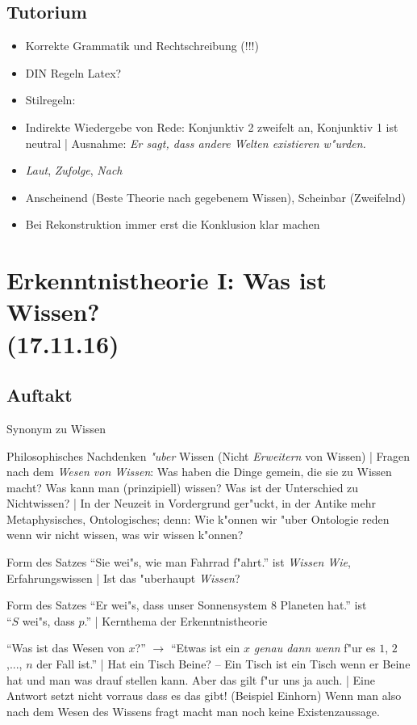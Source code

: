 \documentclass[emulatestandardclasses]{scrartcl}
\begin{document}
\subsection{Tutorium}


\begin{itemize}
  \item Korrekte Grammatik und Rechtschreibung (!!!)
  \item DIN Regeln Latex?
  \item Stilregeln:
  \item Indirekte Wiedergebe von Rede: Konjunktiv 2 zweifelt an, Konjunktiv 1 ist neutral | Ausnahme: \emph{Er sagt, dass andere Welten existieren w"urden.}
  \item \emph{Laut}, \emph{Zufolge}, \emph{Nach}
  \item Anscheinend (Beste Theorie nach gegebenem Wissen), Scheinbar (Zweifelnd)
  \item Bei Rekonstruktion immer erst die Konklusion klar machen
\end{itemize}

\section{Erkenntnistheorie I: Was ist Wissen?\\(17.11.16)}

\subsection{Auftakt}

\begin{description}[leftmargin=!,labelwidth=\widthof{\bfseries Propositionelles Wissen}]
  \item[Erkenntnis] Synonym zu Wissen
  \item[Erkenntnistheorie] Philosophisches Nachdenken \emph{"uber} Wissen (Nicht \emph{Erweitern} von Wissen) | Fragen nach dem \emph{Wesen von Wissen}: Was haben die Dinge gemein, die sie zu Wissen macht? Was kann man (prinzipiell) wissen? Was ist der Unterschied zu Nichtwissen? | In der Neuzeit in Vordergrund ger"uckt, in der Antike mehr Metaphysisches, Ontologisches; denn: Wie k"onnen wir "uber Ontologie reden wenn wir nicht wissen, was wir wissen k"onnen? 
  \item[Erfahrungswissen] Form des Satzes "`Sie wei"s, wie man Fahrrad f"ahrt."' ist \emph{Wissen Wie}, Erfahrungswissen | Ist das "uberhaupt \emph{Wissen}?
  \item[Propositionelles Wissen] Form des Satzes "`Er wei"s, dass unser Sonnensystem 8 Planeten hat."' ist \\"`$S$ wei"s, dass $p$."' | Kernthema der Erkenntnistheorie
  \item[Frage nach dem Wesen] "`Was ist das Wesen von $x$?"' $\rightarrow$ "`Etwas ist ein $x$ \emph{genau dann wenn} f"ur es $1$, $2$,..., $n$ der Fall ist."' | Hat ein Tisch Beine? -- Ein Tisch ist ein Tisch wenn er Beine hat und man was drauf stellen kann. Aber das gilt f"ur uns ja auch. | Eine Antwort setzt nicht vorraus dass es das gibt! (Beispiel Einhorn) Wenn man also nach dem Wesen des Wissens fragt macht man noch keine Existenzaussage.
\end{description}
\end{document}
